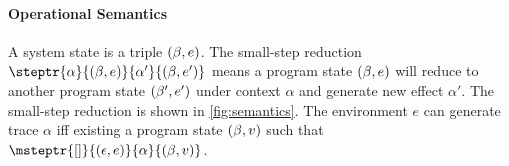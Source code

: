 \paragraph{Operational Semantics} A system state is a triple $(\beta, e)$. The small-step reduction $\steptr{\alpha}{(\buf, e)}{\alpha'}{(\buf, e')}$ means a program state $(\beta, e)$ will reduce to another program state $(\beta', e')$ under context $\alpha$ and generate new effect $\alpha'$.
The small-step reduction is shown in \autoref{fig:semantics}. The environment $e$ can generate trace $\alpha$ iff existing a program state $(\beta, v)$ such that $\msteptr{[]}{(\empQ, e)}{\alpha}{(\buf, v)}$.

